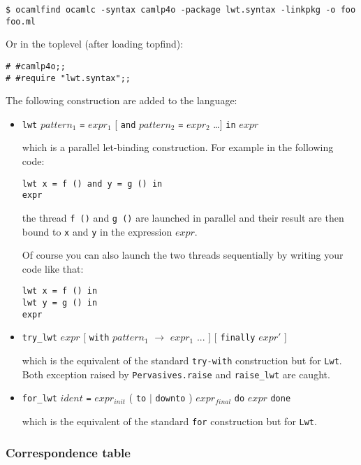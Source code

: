 \documentclass{article}
\newcommand{\lwt}{\texttt{Lwt}\xspace}
\begin{document}
\begin{verbatim}
$ ocamlfind ocamlc -syntax camlp4o -package lwt.syntax -linkpkg -o foo foo.ml
\end{verbatim}

Or in the toplevel (after loading topfind):

\begin{verbatim}
# #camlp4o;;
# #require "lwt.syntax";;
\end{verbatim}

The following construction are added to the language:

\begin{itemize}
\item \texttt{lwt} $pattern_1$ \texttt{=} $expr_1$ [ \texttt{and}
  $pattern_2$ \texttt{=} $expr_2$ \dots ] \texttt{in} $expr$

  which is a parallel let-binding construction. For example in the
  following code:

\begin{verbatim}
lwt x = f () and y = g () in
expr
\end{verbatim}

  the thread \texttt{f ()} and \texttt{g ()} are launched in parallel
  and their result are then bound to \texttt{x} and \texttt{y} in the
  expression $expr$.

  Of course you can also launch the two threads sequentially by
  writing your code like that:

\begin{verbatim}
lwt x = f () in
lwt y = g () in
expr
\end{verbatim}

\item \texttt{try\_lwt} $expr$ [ \texttt{with} $pattern_1$
  \texttt{$\rightarrow$} $expr_1$ ... ] [ \texttt{finally} $expr'$ ]

  which is the equivalent of the standard \texttt{try-with}
  construction but for \lwt. Both exception raised by
  \texttt{Pervasives.raise} and \texttt{raise_lwt} are caught.

\item \texttt{for\_lwt} $ident$ \texttt{=} $expr_{init}$ ( \texttt{to}
  $\mid$ \texttt{downto} ) $expr_{final}$ \texttt{do} $expr$
  \texttt{done}

  which is the equivalent of the standard \texttt{for} construction
  but for \lwt.
\end{itemize}

\subsubsection{Correspondence table}
\end{document}
